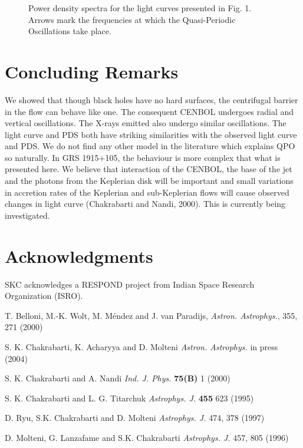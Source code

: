 \documentclass{ws-procs975x65}
\begin{document}
\begin{figure}[t]
\centerline{\epsfxsize=5.1in}
\vskip -3.0cm
\caption{Power density spectra for the light curves presented in Fig. 1. Arrows mark the 
frequencies at which the Quasi-Periodic Oscillations take place.  }
\end{figure}

\section{Concluding Remarks}

We showed that though black holes have no hard surfaces, the centrifugal barrier
in the flow can behave like one. The consequent CENBOL undergoes radial and vertical
oscillations. The X-rays emitted also undergo similar oscillations. The light curve
and PDS both have striking similarities with the observed light curve and PDS. We do not find any other
model in the literature which explains QPO so naturally. In GRS 1915+105, the 
behaviour is more complex that what is presented here. We believe that interaction of the
CENBOL, the base of the jet and the photons from the Keplerian disk will be important and small variations in accretion rates
of the Keplerian and sub-Keplerian flows will cause observed changes in light curve (Chakrabarti and Nandi, 2000). 
This is currently being investigated.

\section*{Acknowledgments}

SKC acknowledges a RESPOND project from Indian Space Research Organization (ISRO).

\begin{thebibliography}{}

\bibitem{} T. Belloni, M.-K. Wolt, M. M\'endez and J. van Paradijs, {\it Astron. Astrophys.},
355, 271 (2000)

\bibitem{} S. K. Chakrabarti, K. Acharyya and D. Molteni {\it Astron. Astrophys.} in press (2004)

\bibitem{} S. K. Chakrabarti and A. Nandi {\it Ind. J. Phys.} {\bf 75(B)} 1 (2000)

\bibitem{} S. K. Chakrabarti and L. G. Titarchuk {\it Astrophys. J.} {\bf 455} 623 (1995)

\bibitem{} D. Ryu, S.K. Chakrabarti and D. Molteni  {\it Astrophys. J.} 474, 378 (1997)

\bibitem{} D. Molteni, G. Lanzafame and S.K. Chakrabarti {\it Astrophys. J.} 457, 805 (1996)

\end{thebibliography}
\end{document}
